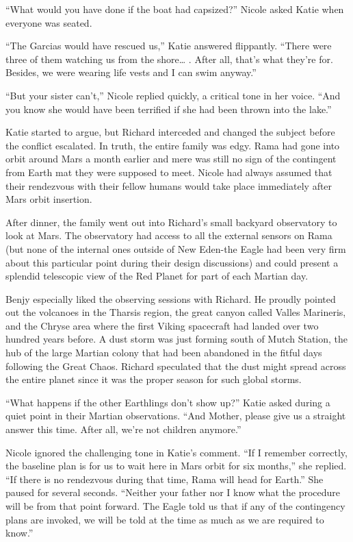 \documentclass[]{article}
\begin{document}
{“What would you have done if the boat had capsized?” Nicole asked Katie when everyone was seated.

“The Garcias would have rescued us,” Katie answered flippantly. “There were three of them watching us from the shore… . After all, that’s what they’re for. Besides, we were wearing life vests and I can swim anyway.”

“But your sister can’t,” Nicole replied quickly, a critical tone in her voice. “And you know she would have been terrified if she had been thrown into the lake.”

Katie started to argue, but Richard interceded and changed the subject before the conflict escalated. In truth, the entire family was edgy. Rama had gone into orbit around Mars a month earlier and mere was still no sign of the contingent from Earth mat they were supposed to meet. Nicole had always assumed that their rendezvous with their fellow humans would take place immediately after Mars orbit insertion.

After dinner, the family went out into Richard’s small backyard observatory to look at Mars. The observatory had access to all the external sensors on Rama (but none of the internal ones outside of New Eden-the Eagle had been very firm about this particular point during their design discussions) and could present a splendid telescopic view of the Red Planet for part of each Martian day.

Benjy especially liked the observing sessions with Richard. He proudly pointed out the volcanoes in the Tharsis region, the great canyon called Valles Marineris, and the Chryse area where the first Viking spacecraft had landed over two hundred years before. A dust storm was just forming south of Mutch Station, the hub of the large Martian colony that had been abandoned in the fitful days following the Great Chaos. Richard speculated that the dust might spread across the entire planet since it was the proper season for such global storms.

“What happens if the other Earthlings don’t show up?” Katie asked during a quiet point in their Martian observations. “And Mother, please give us a straight answer this time. After all, we’re not children anymore.”

Nicole ignored the challenging tone in Katie’s comment. “If I remember correctly, the baseline plan is for us to wait here in Mars orbit for six months,” she replied. “If there is no rendezvous during that time, Rama will head for Earth.” She paused for several seconds. “Neither your father nor I know what the procedure will be from that point forward. The Eagle told us that if any of the contingency plans are invoked, we will be told at the time as much as we are required to know.”

}
\end{document}
